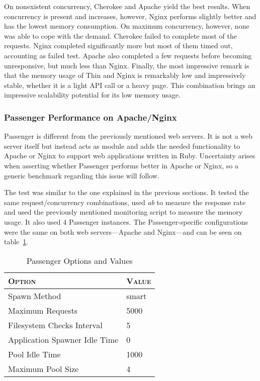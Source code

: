 On nonexistent concurrency, Cherokee and Apache yield the best results. When concurrency is present and increases, however, Nginx performs slightly better and has the lowest memory consumption. On maximum concurrency, however, none was able to cope with the demand. Cherokee failed to complete most of the requests. Nginx completed significantly more but most of them timed out, accounting as failed test. Apache also completed a few requests before becoming unresponsive, but much less than Nginx. Finally, the most impressive remark is that the memory usage of Thin and Nginx is remarkably low and impressively stable, whether it is a light API call or a heavy page. This combination brings an impressive scalability potential for its low memory usage.

\subsubsection{Passenger Performance on Apache/Nginx}
Passenger is different from the previously mentioned web servers. It is not a web server itself but instead acts as module and adds the needed functionality to Apache or Nginx to support web applications written in Ruby. Uncertainty arises when asserting whether Passenger performs better in Apache or Nginx, so a generic benchmark regarding this issue will follow.

The test was similar to the one explained in the previous sections. It tested the same request/concurrency combinations, used \textit{ab} to measure the response rate and used the previously mentioned monitoring script to measure the memory usage. It also used 4 Passenger instances. The Passenger-specific configurations were the same on both web servers---Apache and Nginx---and can be seen on table~\ref{tab:passenger4_configuration}.
\begin{table}[h!t]
  \centering
  \caption{Passenger Options and Values}
  \label{tab:passenger4_configuration}
  
  \begin{tabular}{p{}|p{}}
  
    \textsc{\textbf{Option}} & \textsc{\textbf{Value}} \\ \hline
    Spawn Method & smart \\ \hline
    Maximum Requests & 5000 \\ \hline
    Filesystem Checks Interval & 5 \\ \hline
    Application Spawner Idle Time & 0 \\ \hline
    Pool Idle Time & 1000 \\ \hline
    Maximum Pool Size & 4 \\
  
  \end{tabular}
\end{table}

